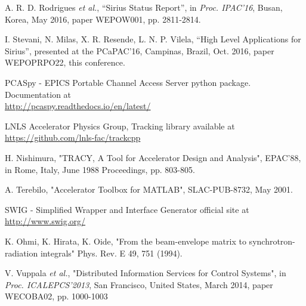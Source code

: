 \documentclass[a4paper,
              ]{jacow}
\begin{document}
\begin{thebibliography}{99}

A. R. D. Rodrigues \emph{et al.},
“Sirius Status Report”,
in \emph{Proc. IPAC'16},
Busan, Korea, May 2016,
paper WEPOW001, pp. 2811-2814.

I. Stevani, N. Milas, X. R. Resende, L. N. P. Vilela,
“High Level Applications for Sirius”,
presented at the PCaPAC'16,
Campinas, Brazil, Oct. 2016,
paper WEPOPRPO22, this conference.

PCASpy - EPICS Portable Channel Access Server python package.
Documentation at \\
\url{http://pcaspy.readthedocs.io/en/latest/}

LNLS Accelerator Physics Group,
Tracking library available at \url{https://github.com/lnls-fac/trackcpp}

H. Nishimura,
"TRACY, A Tool for Accelerator Design and Analysis",
EPAC'88,
in Rome, Italy, June 1988
Proceedings, pp. 803-805.

A. Terebilo,
"Accelerator Toolbox for MATLAB",
SLAC-PUB-8732, May 2001.

SWIG - Simplified Wrapper and Interface Generator
official site at \url{http://www.swig.org/}

K. Ohmi, K. Hirata, K. Oide,
"From the beam-envelope matrix to synchrotron-radiation integrals"
Phys. Rev. E 49, 751 (1994).

V. Vuppala \emph{et al.},
"Distributed Information Services for Control Systems",
in \emph{Proc. ICALEPCS'2013},
San Francisco, United States, March 2014,
paper WECOBA02, pp. 1000-1003

\end{thebibliography}
\end{document}
